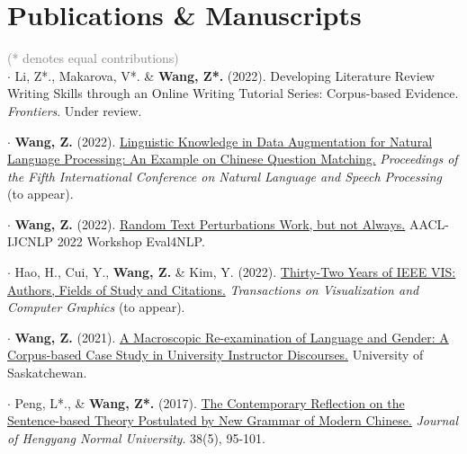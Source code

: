 \documentclass[letterpaper,11pt]{article}
\newcommand{\resumeSubHeadingListStart}{\begin{itemize}[leftmargin=0.15in, label={}]}
\newcommand{\resumeSubHeadingListEnd}{\end{itemize}}
\begin{document}

\section{Publications \& Manuscripts}

  \resumeSubHeadingListStart
    \small{\item{
    \textcolor{gray}{(* denotes equal contributions)} \\ \vspace{2pt}
        $\cdot$ Li, Z*., Makarova, V*. \& \textbf{Wang, Z*.} (2022). Developing Literature Review Writing Skills through an Online Writing Tutorial Series: Corpus-based Evidence. \emph{Frontiers}. Under review. \\ \vspace{2pt}

        $\cdot$ \textbf{Wang, Z.} (2022). \href{https://arxiv.org/abs/2111.14709}{Linguistic Knowledge in Data Augmentation for Natural Language Processing: An Example on Chinese Question Matching.} \emph{Proceedings of the Fifth International Conference on Natural Language and Speech Processing} (to appear). \\ \vspace{2pt}
        
        $\cdot$ \textbf{Wang, Z.} (2022). \href{https://arxiv.org/abs/2209.00797}{Random Text Perturbations Work, but not Always.} AACL-IJCNLP 2022 Workshop Eval4NLP. \\ \vspace{2pt}
        
        $\cdot$ Hao, H., Cui, Y., \textbf{Wang, Z.} \& Kim, Y. (2022). \href{https://arxiv.org/abs/2208.03772}{Thirty-Two Years of IEEE VIS: Authors, Fields of Study and Citations.} \emph{Transactions on Visualization and Computer Graphics} (to appear).  \\ \vspace{2pt}
        
        $\cdot$ \textbf{Wang, Z.} (2021). \href{https://harvest.usask.ca/handle/10388/13387}{A Macroscopic Re-examination of Language and Gender: A Corpus-based Case Study in University Instructor Discourses.} University of Saskatchewan. \\ \vspace{2pt}
        
        $\cdot$ Peng, L*., \& \textbf{Wang, Z*.} (2017). \href{https://www.researchgate.net/publication/340730935_The_contemporary_reflection_on_the_Sentence-Based_theory_postulated_by_New_Grammar_of_Modern_Chinese}{The Contemporary Reflection on the Sentence-based Theory Postulated by New Grammar of Modern Chinese.} \emph{Journal of Hengyang Normal University}. 38(5), 95-101.
    }} \\ \vspace{-5pt}
  \resumeSubHeadingListEnd
  
\end{document}
